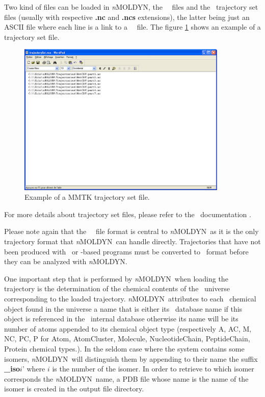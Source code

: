 \documentclass[a4paper,11pt]{report}
\newcommand{\NMOLDYN}{\textit{n}MOLDYN}
\begin{document}
Two kind of files can be loaded in \NMOLDYN, the \MMTK\ \NetCDF\ files and the \MMTK\ trajectory set 
files (usually with respective \textbf{.nc} and \textbf{.ncs} extensions), the latter being just an ASCII file where each 
line is a link to a \MMTK\ \NetCDF\ file. The figure \ref{fig:trajectory_set} shows an example of a trajectory set file. 
\begin{figure}[h!]
\begin{center}
\includegraphics[width=10cm]{Figures/trajectory_set.eps}
\end{center}
\caption[Example of a MMTK trajectory set file]{Example of a MMTK trajectory set file.}
\label{fig:trajectory_set}
\end{figure}   

For more details about trajectory set files, please refer to the \MMTK\ documentation \cite{MMTK_TrajectorySet}.

Please note again that the \MMTK\ \NetCDF\ file format is central to \NMOLDYN\ as it is the only trajectory format that \NMOLDYN\ 
can handle directly. Trajectories that have not been produced with \MMTK\ or \MMTK -based programs must be converted 
to \MMTK\ format before they can be analyzed with \NMOLDYN.

One important step that is performed by \NMOLDYN\ when loading the trajectory is the determination of the chemical contents of 
the \MMTK\ universe corresponding to the loaded trajectory. \NMOLDYN\ attributes to each \MMTK\ chemical object found in 
the universe  a name that is either its \MMTK\ database name if this object is referenced in the \MMTK\ internal database 
otherwise its name will be its number of atoms appended to its chemical object type (respectively A, AC, M, NC, PC, P for Atom, 
AtomCluster, Molecule, NucleotideChain, PeptideChain, Protein chemical types.). In the seldom case where the system contains some isomers, 
\NMOLDYN\ will distinguish them by appending to their name the suffix \textbf{\_iso$i$}' where $i$ is the number of 
the isomer. In order to retrieve to which isomer corresponds the \NMOLDYN\ name, a PDB file whose name is the name of the isomer is created in the output file directory.
\end{document}

